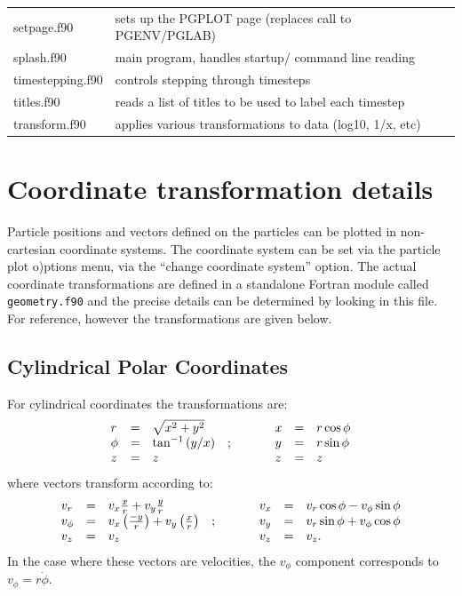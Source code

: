 \documentclass[a4paper,10pt]{article}
\begin{document}
\begin{longtable}{|lp{}|}
     setpage.f90            & sets up the PGPLOT page (replaces call to PGENV/PGLAB)\\
     splash.f90	 & main program, handles startup/ command line reading\\
     timestepping.f90       & controls stepping through timesteps\\
     titles.f90        & reads a list of titles to be used to label each timestep\\
     transform.f90	 	 & applies various transformations to data (log10, 1/x, etc) \\
\end{longtable}

\section{Coordinate transformation details}
\label{sec:coordtransforms}
Particle positions and vectors defined on the particles can be plotted in non-cartesian coordinate
systems. The coordinate system can be set via the particle plot o)ptions menu, via the ``change coordinate
system'' option. The actual coordinate transformations are defined in a standalone Fortran module called
\verb+geometry.f90+ and the precise details can be determined by looking in this file. For reference, however the transformations are given below.

\subsection{ Cylindrical Polar Coordinates}
For cylindrical coordinates the transformations are:
\begin{displaymath}
\begin{array}{lclp{1cm}lcl}
r & = & \sqrt{x^2 + y^2}    & & x & = & r\cos\phi \\
\phi & = & \tan^{-1}{(y/x)} &; & y & = & r\sin\phi \\
z & = & z                             & & z & = & z\\
\end{array}
\end{displaymath}
where vectors transform according to:
\begin{displaymath}
\begin{array}{lclp{1cm}lcl}
v_r      & = & v_x \frac{x}{r} + v_y \frac{y}{r}  & & v_x & = & v_r \cos\phi - v_\phi \sin\phi \\
v_\phi & = & v_x \left(\frac{-y}{r}\right) + v_y \left(\frac{x}{r}\right) &; &v_y & = & v_r \sin\phi + v_\phi \cos\phi \\
v_z      & = & v_z & & v_z & = & v_z. \\
\end{array}
\end{displaymath}
In the case where these vectors are velocities, the $v_{\phi}$ component corresponds to $v_{\phi} = r\dot{\phi}$.
\end{document}
